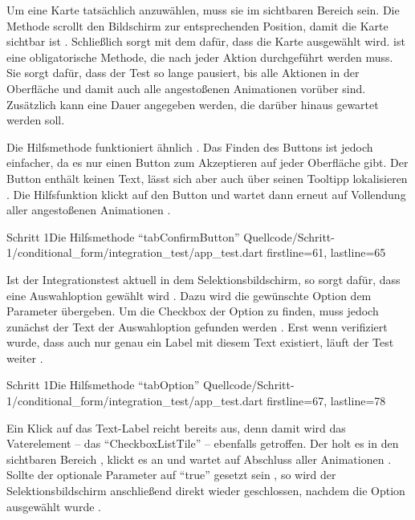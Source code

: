 Um eine Karte tatsächlich anzuwählen, muss sie im sichtbaren Bereich sein.
Die Methode  scrollt den Bildschirm zur entsprechenden Position, damit die Karte sichtbar ist .
Schließlich sorgt  mit dem   dafür,
dass die Karte ausgewählt wird.   ist eine obligatorische Methode,
die nach jeder Aktion durchgeführt werden muss. Sie sorgt dafür,
dass der Test so lange pausiert,
bis alle Aktionen in der Oberfläche und damit auch alle angestoßenen Animationen vorüber sind. Zusätzlich kann eine Dauer angegeben werden, die darüber hinaus gewartet werden soll. 

Die Hilfsmethode  funktioniert ähnlich \Lst{\ref{lst:Schritt1HilfsmethodeTabConfirmButton}}.
Das Finden des Buttons ist jedoch einfacher, da es nur einen Button zum Akzeptieren auf jeder Oberfläche gibt.
Der Button enthält keinen Text, lässt sich aber auch über seinen Tooltipp lokalisieren .
Die Hilfsfunktion klickt auf den Button  und wartet dann erneut auf Vollendung aller angestoßenen Animationen .

\begin{alexlisting}{Schritt 1}{Die Hilfsmethode \enquote{tabConfirmButton}}
  {Quellcode/Schritt-1/conditional_form/integration_test/app_test.dart}
  {firstline=61, lastline=65}
  \label{lst:Schritt1HilfsmethodeTabConfirmButton}
\end{alexlisting}

Ist der Integrationstest aktuell in dem Selektionsbildschirm, so sorgt  dafür, dass eine Auswahloption gewählt wird \Lst{\ref{lst:Schritt1HilfsmethodeTabOption}}.
Dazu wird die gewünschte Option dem Parameter  übergeben.
Um die Checkbox der Option zu finden, muss jedoch zunächst der Text der Auswahloption gefunden werden .
Erst wenn verifiziert wurde, dass auch nur genau ein Label mit diesem Text existiert, läuft der Test weiter . 

\begin{alexlisting}{Schritt 1}{Die Hilfsmethode \enquote{tabOption}}
  {Quellcode/Schritt-1/conditional_form/integration_test/app_test.dart}
  {firstline=67, lastline=78}
  \label{lst:Schritt1HilfsmethodeTabOption}
\end{alexlisting}

Ein Klick auf das Text-Label reicht bereits aus,
denn damit wird das Vaterelement -- das \enquote{CheckboxListTile} -- ebenfalls getroffen.
Der  holt es in den sichtbaren Bereich , klickt es an  und wartet auf Abschluss aller Animationen .
Sollte der optionale Parameter  auf \enquote{true} gesetzt sein , so wird der Selektionsbildschirm anschließend direkt wieder geschlossen, nachdem die Option ausgewählt wurde  . 
  
